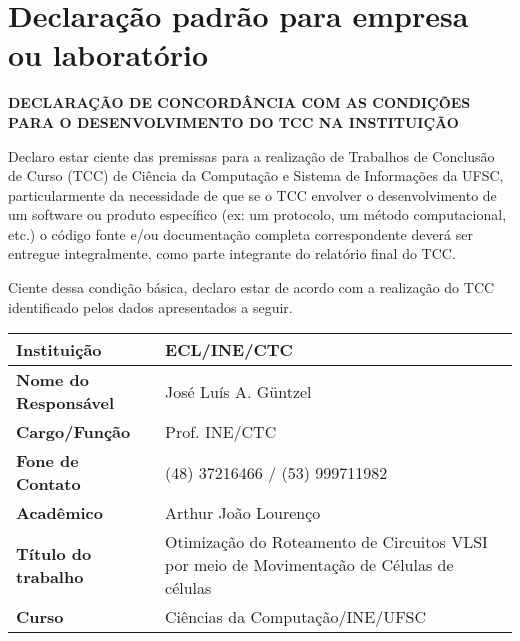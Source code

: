 \chapter{Declaração padrão para empresa ou laboratório}
	\begin{snugshade}

	\begin{center}
	{\textbf{DECLARAÇÃO DE CONCORDÂNCIA COM AS CONDIÇÕES PARA O DESENVOLVIMENTO DO TCC NA INSTITUIÇÃO}}
	\end{center}
		
	\end{snugshade}

	\vspace{10pt}

	Declaro estar ciente das premissas para a realização de Trabalhos de Conclusão de Curso (TCC) de Ciência da Computação e Sistema de In\-for\-ma\-ções da UFSC, particularmente da necessidade de que se o TCC envolver o desenvolvimento de um software ou produto específico (ex: um protocolo, um método computacional, etc.) o código fonte e/ou documentação completa correspondente deverá ser entregue integralmente, como parte integrante do relatório final do TCC. 

	Ciente dessa condição básica, declaro estar de acordo com a realização do TCC identificado pelos dados apresentados a seguir.

	\vspace{20pt}


		\begin{tabular}{|l|X p{8cm}|}
				\hline
			     \textbf{Instituição} &  ECL/INE/CTC \\ \hline
			     \textbf{Nome do Responsável} &  José Luís A. G{\"u}ntzel \\ \hline
			     \textbf{Cargo/Função} &  Prof. INE/CTC \\ \hline
			     \textbf{Fone de Contato} &  (48) 37216466 / (53) 999711982 \\ \hline
			     \textbf{Acadêmico} & Arthur João Lourenço \\ \hline
			     \textbf{Título do trabalho} & Otimização do Roteamento de Circuitos VLSI por meio de Movimentação de Células
de células \\ \hline
			     \textbf{Curso} & Ciências da Computação/INE/UFSC \\ \hline

		\end{tabular}

